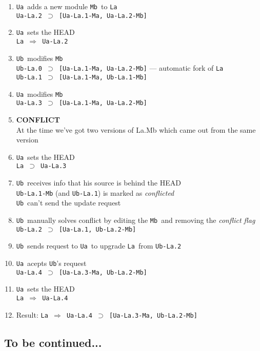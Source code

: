 \documentclass[10pt]{article}
\def\Ua{{\tt Ua}}
\def\Ub{{\tt Ub}}
\def\La{{\tt La}}
\def\Mb{{\tt Mb}}
\def\headsto{${\Longrightarrow}$ }
\def\hto{\headsto}
\def\eq{${\supset}$ }
\begin{document}
		\begin{enumerate}
			\item{\Ua\ adds a new module \Mb\ to \La\\
            		{\tt Ua-La.2 \eq [Ua-La.1-Ma, Ua-La.2-Mb]}
			}
			\item{\Ua\ sets the HEAD\\
				{\tt La \hto Ua-La.2}
			}
			\item{\Ub\ modifies \Mb\\
				{\tt Ub-La.0 \eq [Ua-La.1-Ma, Ua-La.2-Mb]} --- automatic fork of \La\\
				{\tt Ub-La.1 \eq [Ua-La.1-Ma, Ub-La.1-Mb]}
			}
			\item{\Ua\ modifies \Mb\\
				{\tt Ua-La.3 \eq [Ua-La.1-Ma, Ua-La.2-Mb]}
			}
			\item{{\bf CONFLICT}\\
            		At the time we've got two versions of La.Mb which came out from the same version
            	}
            	\item{\Ua\ sets the HEAD\\
            		{\tt La \eq Ua-La.3}
            	}
            	\item{\Ub\ receives info that his source is behind the HEAD\\
				{\tt Ub-La.1-Mb} (and {\tt Ub-La.1}) is marked as {\em conflicted}\\
				\Ub\ can't send the update request
			}
			\item{\Ub\ manually solves conflict by editing the \Mb\ and removing the {\em conflict flag}\\
				{\tt Ub-La.2 \eq [Ua-La.1, Ub-La.2-Mb]}
			}
			\item{\Ub\ sends request to \Ua\ to upgrade \La\ from {\tt Ub-La.2}}
			\item{\Ua\ acepts \Ub's request\\
				{\tt Ua-La.4 \eq [Ua-La.3-Ma, Ub-La.2-Mb]}
			}
			\item{\Ua\ sets the HEAD\\
				{\tt La \hto Ua-La.4}
			}
			\item{Result: {\tt La \hto Ua-La.4 \eq [Ua-La.3-Ma, Ub-La.2-Mb]}}
		\end{enumerate}
		
	\subsection*{To be continued...}
\end{document}
